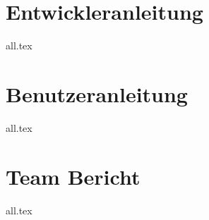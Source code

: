 













\tableofcontents




\texttt{}
\begin{lstlisting}[language=bash, keywords={}]
\end{lstlisting}
\begin{lstlisting}[language={[x86masm]Assembler}]
\end{lstlisting}
\begin{lstlisting}[language=C++]
\end{lstlisting}

\chapter{Entwickleranleitung}
\label{dev}
{all.tex}

\chapter{Benutzeranleitung}
\label{user}
{all.tex}

\chapter{Team Bericht}
\label{team}
{all.tex}



